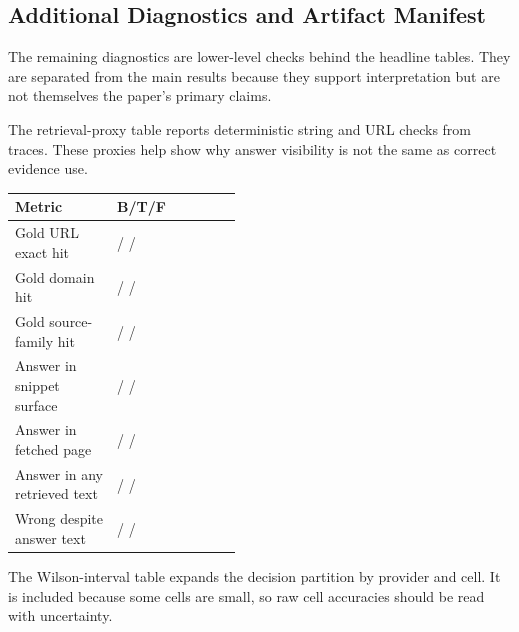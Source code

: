 \subsection{Additional Diagnostics and Artifact Manifest}
The remaining diagnostics are lower-level checks behind the headline tables. They are separated from the main results because they support interpretation but are not themselves the paper's primary claims.

The retrieval-proxy table reports deterministic string and URL checks from traces. These proxies help show why answer visibility is not the same as correct evidence use.

\begin{center}
\footnotesize
\setlength{\tabcolsep}{2pt}
\begin{tabularx}{\linewidth}{@{}L{0.45\linewidth}Y@{}}
\toprule
\textbf{Metric} & \textbf{B/T/F} \\
\midrule
Gold URL exact hit & \BraveGoldURLExact{} / \TavilyGoldURLExact{} / \FirecrawlGoldURLExact{} \\
Gold domain hit & \BraveGoldDomain{} / \TavilyGoldDomain{} / \FirecrawlGoldDomain{} \\
Gold source-family hit & \BraveGoldFamily{} / \TavilyGoldFamily{} / \FirecrawlGoldFamily{} \\
Answer in snippet surface & \BraveSnippetSurfaceHit{} / \TavilySnippetSurfaceHit{} / \FirecrawlSnippetSurfaceHit{} \\
Answer in fetched page & \BraveAnswerPage{} / \TavilyAnswerPage{} / \FirecrawlAnswerPage{} \\
Answer in any retrieved text & \BraveAnswerAvailable{} / \TavilyAnswerAvailable{} / \FirecrawlAnswerAvailable{} \\
Wrong despite answer text & \BraveWrongWithAnswer{} / \TavilyWrongWithAnswer{} / \FirecrawlWrongWithAnswer{} \\
\bottomrule
\end{tabularx}
\label{tab:app-retrieval-diagnostics}
\end{center}

The Wilson-interval table expands the decision partition by provider and cell. It is included because some cells are small, so raw cell accuracies should be read with uncertainty.

